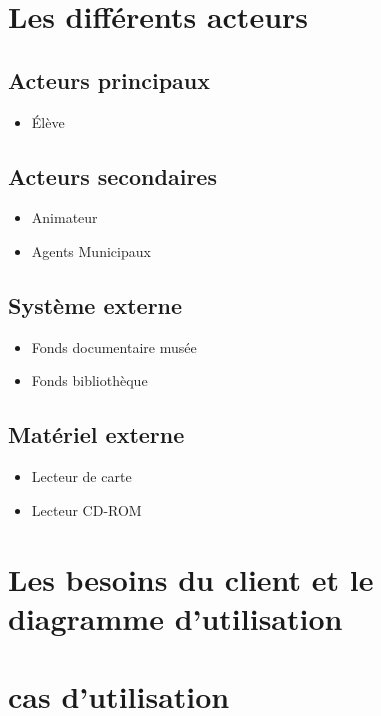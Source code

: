 \documentclass{article}
\begin{document}
	\maketitle
	\section{Les différents acteurs}
		\subsection{Acteurs principaux}
		\begin{itemize}
			\item Élève 
		\end{itemize}
		\subsection{Acteurs secondaires}
		\begin{itemize}
			\item Animateur
			\item Agents Municipaux
		\end{itemize}
		\subsection{Système externe}
		\begin{itemize}
			\item Fonds documentaire musée 
			\item Fonds bibliothèque
		\end{itemize}
		\subsection{Matériel externe}
		\begin{itemize}
			\item Lecteur de carte
			\item Lecteur CD-ROM 
		\end{itemize}

		\newpage
	\section{Les besoins du client et le diagramme d'utilisation}
	\begin{center}\end{center}
	\section{cas d'utilisation}
\end{document}
